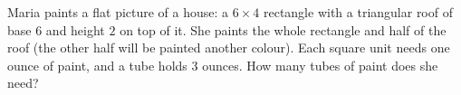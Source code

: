 Maria paints a flat picture of a house: a $6\times4$ rectangle with a triangular roof of base $6$ and height $2$ on top of it. She paints the whole rectangle and half of the roof (the other half will be painted another colour). Each square unit needs one ounce of paint, and a tube holds $3$ ounces. How many tubes of paint does she need?
